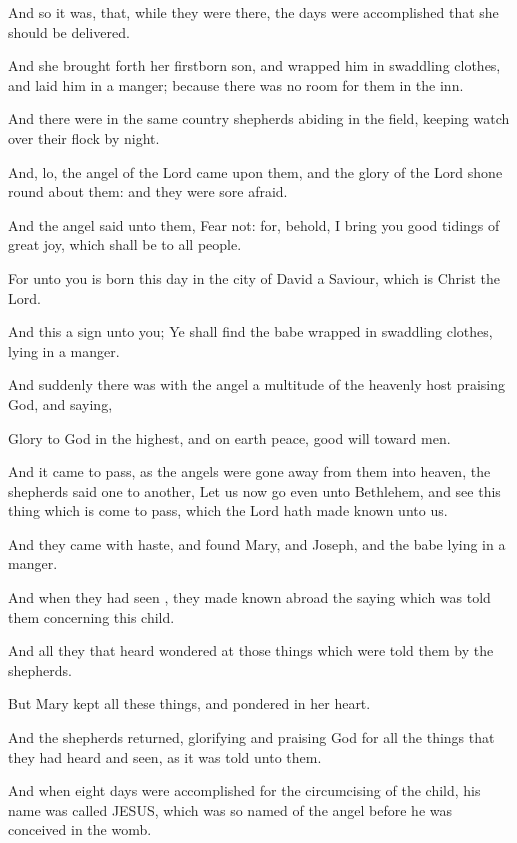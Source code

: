 {And so it
was, that,
while
they
were
there, the
days were
accomplished that
she should be
delivered.

And she brought
forth
her
firstborn
son,
and
wrapped
him in swaddling
clothes,
and
laid
him
in a
manger;
because there
was
no
room for
them
in the
inn.

And there
were
in the
same
country
shepherds abiding in the
field,
keeping
watch
over
their
flock by
night.

And,
lo, the
angel of the
Lord came
upon
them,
and the
glory of the
Lord shone round
about
them:
and they
were
sore
afraid.

And the
angel
said unto
them,
Fear
not:
for,
behold, I
bring
you good
tidings
of
great
joy,
which shall
be
to
all
people.

For unto
you is
born this
day
in the
city of
David a
Saviour,
which
is
Christ the
Lord.

And
this
{} a
sign unto
you; Ye shall
find the
babe wrapped in swaddling
clothes,
lying
in a
manger.

And
suddenly there
was
with the
angel a
multitude of the
heavenly
host
praising
God,
and
saying,

Glory to
God
in the
highest,
and
on
earth
peace, good
will
toward
men.

And it came to
pass,
as the
angels were gone
away
from
them
into
heaven, the
shepherds
said
one
to
another, Let
us
now
go even
unto
Bethlehem,
and
see
this
thing which is come to
pass,
which the
Lord hath made
known unto
us.

And they
came with
haste,
and
found
Mary,
and
Joseph,
and the
babe
lying
in a
manger.

And when they had
seen
{}, they made
known
abroad the
saying which was
told
them
concerning
this
child.

And
all they that
heard
{}
wondered
at those things
which were
told
them
by the
shepherds.

But
Mary
kept
all
these
things, and
pondered
{}
in
her
heart.

And the
shepherds
returned,
glorifying
and
praising
God
for
all the things
that they had
heard
and
seen,
as it was
told
unto
them.

And
when
eight
days were
accomplished for the
circumcising of the
child,
his
name was
called
JESUS, which was so
named
of the
angel
before
he was
conceived
in the
womb.

}
